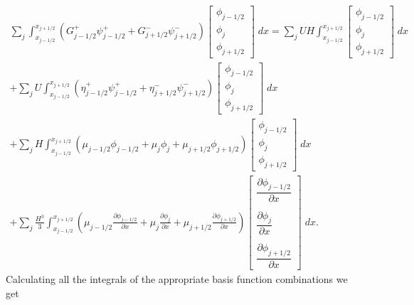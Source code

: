 \begin{multline*}
\sum_j \int_{x_{j-1/2}}^{x_{j + 1/2}} \left(G^+_{j-1/2}\psi^+_{j - 1/2} + G^-_{j+1/2}\psi^-_{j + 1/2}\right) \begin{bmatrix}
\phi_{j-1/2}\\\phi_j \\\phi_{j+1/2}
\end{bmatrix}  \; dx =   \sum_j UH\int_{x_{j-1/2}}^{x_{j + 1/2}}  \begin{bmatrix}
\phi_{j-1/2}\\\phi_j \\\phi_{j+1/2}
\end{bmatrix}  \; dx \\ + \sum_j U\int_{x_{j-1/2}}^{x_{j + 1/2}} \left(\eta^+_{j-1/2}\psi^+_{j - 1/2} + \eta^-_{j+1/2}\psi^-_{j + 1/2}\right) \begin{bmatrix}
\phi_{j-1/2}\\\phi_j \\\phi_{j+1/2}
\end{bmatrix}  \; dx \\   +\sum_j H\int_{x_{j-1/2}}^{x_{j + 1/2}} \left(\mu_{j-1/2}\phi_{j - 1/2} + \mu_{j}\phi_{j}+ \mu_{j+1/2}\phi_{j + 1/2}\right) \begin{bmatrix}
\phi_{j-1/2}\\\phi_j \\\phi_{j+1/2}
\end{bmatrix}  \; dx \\ + 
\sum_j \frac{H^3}{3}\int_{x_{j-1/2}}^{x_{j + 1/2}} \left(\mu_{j-1/2} \frac{\partial \phi_{j - 1/2} }{\partial x} + \mu_{j}\frac{\partial \phi_{j} }{\partial x}+ \mu_{j+1/2}\frac{\partial \phi_{j + 1/2} }{\partial x}\right) \begin{bmatrix}
\dfrac{\partial \phi_{j - 1/2} }{\partial x}\\ \\\dfrac{\partial \phi_{j} }{\partial x}\\ \\\dfrac{\partial \phi_{j + 1/2} }{\partial x}   \end{bmatrix} \; dx.
\end{multline*}
Calculating all the integrals of the appropriate basis function combinations we get 
